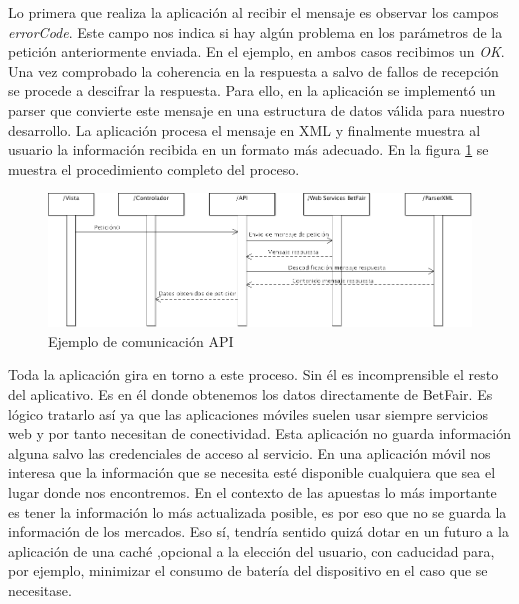   Lo primera que realiza la aplicación al recibir el mensaje es observar los campos \emph{errorCode}. Este campo nos indica si hay algún problema en los parámetros de la petición anteriormente enviada. En el ejemplo, en ambos casos recibimos un \emph{OK}. Una vez comprobado la coherencia en la respuesta a salvo de fallos de recepción se procede a descifrar la respuesta. Para ello, en la aplicación se implementó un parser que convierte este mensaje en una estructura de datos válida para nuestro desarrollo.  La aplicación procesa el mensaje en XML y finalmente muestra al usuario la información recibida en un formato más adecuado. En la figura \ref{fig:proceso} se muestra el procedimiento completo del proceso.
       
 \begin{figure}[h!]
    \centering
       \includegraphics[width=1.2\textwidth]{./images/modelo_accion.png}
     \caption{Ejemplo de comunicación API }
   \label{fig:proceso}
\end{figure}
 
    
    Toda la aplicación gira en torno a este proceso. Sin él es incomprensible el resto del aplicativo. Es en él donde obtenemos los datos directamente de BetFair. Es lógico tratarlo así ya que las aplicaciones móviles suelen usar siempre servicios web y por tanto necesitan de conectividad. Esta aplicación no guarda información alguna salvo las credenciales de acceso al servicio. En una aplicación móvil nos interesa que la información que se necesita esté disponible cualquiera que sea el lugar donde nos encontremos. En el contexto de las apuestas lo más importante es tener la información lo más actualizada posible, es por eso que no se guarda la información de los mercados. Eso sí, tendría sentido quizá dotar en un futuro a la aplicación de una caché ,opcional a la elección del usuario, con caducidad para, por ejemplo, minimizar el consumo de batería del dispositivo en el caso que se necesitase.  
   

